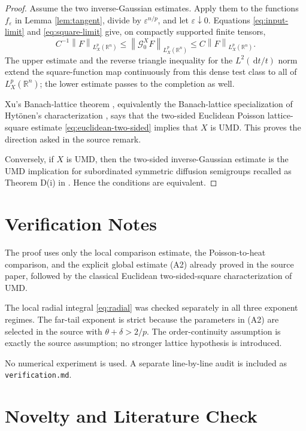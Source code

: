 \documentclass[11pt]{article}
\newcommand{\R}{\mathbb R}
\newcommand{\G}{\mathcal G}
\newcommand{\norm}[1]{\left\lVert #1\right\rVert}
\newcommand{\eps}{\varepsilon}
\newcommand{\dd}{\,\mathrm d}
\begin{document}
\begin{proof}
Assume the two inverse-Gaussian estimates. Apply them to the functions
\(f_\eps\) in Lemma \ref{lem:tangent}, divide by \(\eps^{n/p}\), and let
\(\eps\downarrow0\). Equations \eqref{eq:input-limit} and
\eqref{eq:square-limit} give, on compactly supported finite tensors,
\[
 C^{-1}\norm F_{L_X^p(\R^n)}
 \le\norm{\G_0^XF}_{L_X^p(\R^n)}
 \le C\norm F_{L_X^p(\R^n)}.
 \tag{10}\label{eq:euclidean-two-sided}
\]
The upper estimate and the reverse triangle inequality for the
\(L^2(\dd t/t)\) norm extend the square-function map continuously from this
dense test class to all of \(L_X^p(\R^n)\); the lower estimate passes to the
completion as well.

Xu's Banach-lattice theorem \cite[Theorem 4.1]{Xu}, equivalently the
Banach-lattice specialization of Hyt\"onen's characterization
\cite[Theorem 1.6]{Hytonen}, says that the two-sided Euclidean Poisson
lattice-square estimate \eqref{eq:euclidean-two-sided} implies that \(X\) is
UMD. This proves the direction asked in the source remark.

Conversely, if \(X\) is UMD, then the two-sided inverse-Gaussian estimate is
the UMD implication for subordinated symmetric diffusion semigroups recalled
as Theorem D(i) in \cite{ABFR}. Hence the conditions are equivalent.
\end{proof}

\section*{Verification Notes}

The proof uses only the local comparison estimate, the Poisson-to-heat
comparison, and the explicit global estimate (A2) already proved in the
source paper, followed by the classical Euclidean two-sided-square
characterization of UMD.

The local radial integral \eqref{eq:radial} was checked separately in all
three exponent regimes. The far-tail exponent is strict because the
parameters in (A2) are selected in the source with
\(\theta+\delta>2/p\). The order-continuity assumption is exactly the source
assumption; no stronger lattice hypothesis is introduced.

No numerical experiment is used. A separate line-by-line audit is included
as \texttt{verification.md}.

\section*{Novelty and Literature Check}
\end{document}
